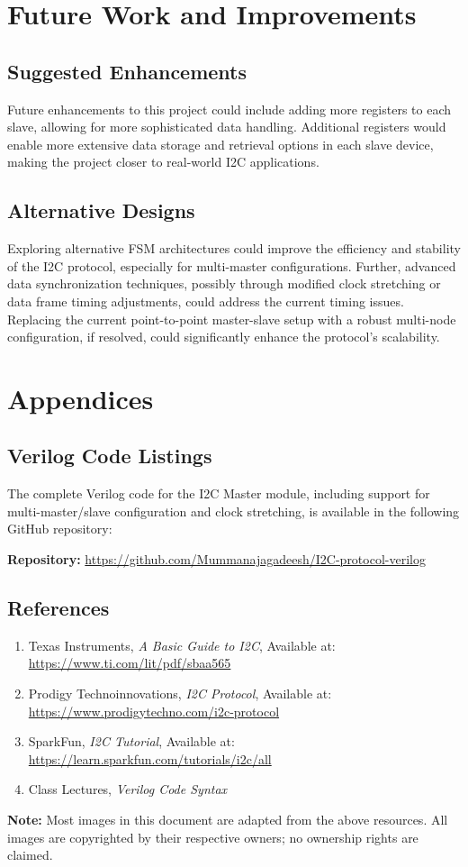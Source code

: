 \documentclass[a4paper,12pt]{report}
\begin{document}
\chapter{Future Work and Improvements}

\section{Suggested Enhancements}
Future enhancements to this project could include adding more registers to each slave, allowing for more sophisticated data handling. Additional registers would enable more extensive data storage and retrieval options in each slave device, making the project closer to real-world I2C applications.

\section{Alternative Designs}
Exploring alternative FSM architectures could improve the efficiency and stability of the I2C protocol, especially for multi-master configurations. Further, advanced data synchronization techniques, possibly through modified clock stretching or data frame timing adjustments, could address the current timing issues. Replacing the current point-to-point master-slave setup with a robust multi-node configuration, if resolved, could significantly enhance the protocol's scalability.

\newpage
\chapter{Appendices}

\section{Verilog Code Listings}

The complete Verilog code for the I2C Master module, including support for multi-master/slave configuration and clock stretching, is available in the following GitHub repository:

\vspace{0.5cm}
\noindent
\textbf{Repository:} \url{https://github.com/Mummanajagadeesh/I2C-protocol-verilog}

\section{References}
\begin{enumerate}
    \item Texas Instruments, \emph{A Basic Guide to I2C}, Available at: \url{https://www.ti.com/lit/pdf/sbaa565}
    \item Prodigy Technoinnovations, \emph{I2C Protocol}, Available at: \url{https://www.prodigytechno.com/i2c-protocol}
    \item SparkFun, \emph{I2C Tutorial}, Available at: \url{https://learn.sparkfun.com/tutorials/i2c/all}
    \item Class Lectures, \emph{Verilog Code Syntax}
\end{enumerate}

\vspace{0.5cm}
\noindent \textbf{Note:} Most images in this document are adapted from the above resources. All images are copyrighted by their respective owners; no ownership rights are claimed.
\end{document}
